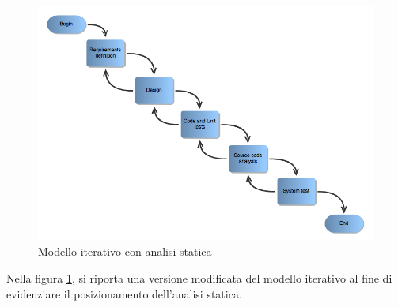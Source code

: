 \begin{figure}[!h]
\centering
\includegraphics[width=13.5cm]{iterative.png}
\caption{Modello iterativo con analisi statica}\label{iterativo}
\end{figure}

Nella figura \ref{iterativo}, si riporta una versione modificata del modello iterativo al fine di evidenziare il posizionamento dell'analisi statica.


